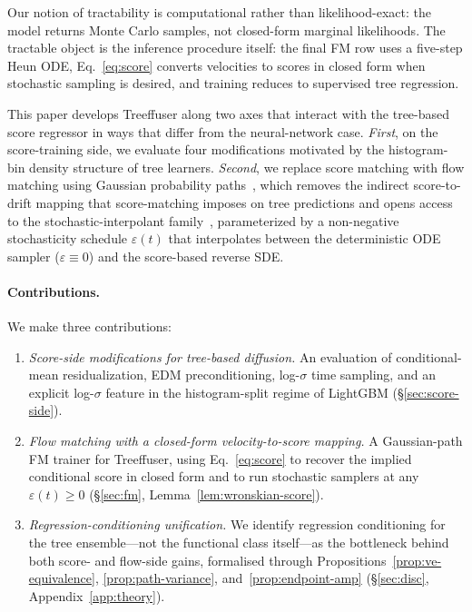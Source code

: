 \documentclass{uai2026}
\begin{document}
Our notion of tractability is computational rather than likelihood-exact: the model returns Monte Carlo samples, not closed-form marginal likelihoods. The tractable object is the inference procedure itself: the final FM row uses a five-step Heun ODE, Eq.~\eqref{eq:score} converts velocities to scores in closed form when stochastic sampling is desired, and training reduces to supervised tree regression.

This paper develops Treeffuser along two axes that interact with the tree-based score regressor in ways that differ from the neural-network case. \emph{First}, on the score-training side, we evaluate four modifications motivated by the histogram-bin density structure of tree learners. \emph{Second}, we replace score matching with flow matching using Gaussian probability paths~\citep{lipman2023flow,liu2023rectified}, which removes the indirect score-to-drift mapping that score-matching imposes on tree predictions and opens access to the stochastic-interpolant family~\citep{albergo2023stochastic}, parameterized by a non-negative stochasticity schedule $\varepsilon(t)$ that interpolates between the deterministic ODE sampler ($\varepsilon \equiv 0$) and the score-based reverse SDE.

\paragraph{Contributions.} We make three contributions:
\begin{enumerate}
  \item \emph{Score-side modifications for tree-based diffusion.} An evaluation of conditional-mean residualization, EDM preconditioning, log-$\sigma$ time sampling, and an explicit log-$\sigma$ feature in the histogram-split regime of LightGBM (\S\ref{sec:score-side}).
  \item \emph{Flow matching with a closed-form velocity-to-score mapping.} A Gaussian-path FM trainer for Treeffuser, using Eq.~\eqref{eq:score} to recover the implied conditional score in closed form and to run stochastic samplers at any $\varepsilon(t)\geq 0$ (\S\ref{sec:fm}, Lemma~\ref{lem:wronskian-score}).
  \item \emph{Regression-conditioning unification.} We identify regression conditioning for the tree ensemble---not the functional class itself---as the bottleneck behind both score- and flow-side gains, formalised through Propositions~\ref{prop:ve-equivalence}, \ref{prop:path-variance}, and~\ref{prop:endpoint-amp} (\S\ref{sec:disc}, Appendix~\ref{app:theory}).
\end{enumerate}
\end{document}
